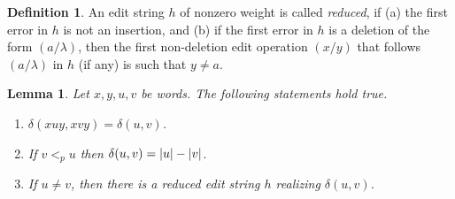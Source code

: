 \documentclass{article}
\theoremstyle{plain}
\newtheorem{lemma}[theorem]{Lemma}
\theoremstyle{definition}
\newtheorem{definition}[theorem]{Definition}
\theoremstyle{remark}
\newcommand{\abs}[1]{\left|\mathinner{#1}\right|}
\newcommand{\e}{\lambda}
\newcommand\dsid{\ensuremath{\delta}\xspace}
\begin{document}
\begin{definition}
An edit string $h$ of nonzero weight is called \emph{reduced}, if
(a) the first error in $h$ is not an insertion, and
(b) if the first error in $h$ is a deletion of the form $(a/\e)$, then the first non-deletion edit operation $(x/y)$ that follows $(a/\e)$ in $h$ (if any) is such that $y\not=a$.
\end{definition}




\begin{lemma}\label{lem:didist}
Let $x,y,u,v$ be words. The following statements hold true.
\begin{enumerate}
\item
$\dsid(xuy,xvy) = \dsid(u,v)$.
\item
If $v<_p u$ then $\dsid(u,v)=\abs u-\abs v$.
\item
If $u\not=v$, then there is a reduced edit string $h$
realizing $\dsid(u,v)$.
\end{enumerate}
\end{lemma}
\end{document}
